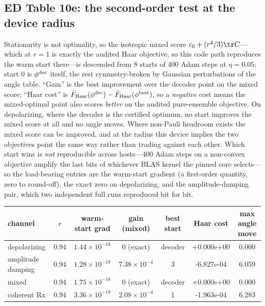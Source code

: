 \documentclass[10pt,a4paper]{article}
\begin{document}
\subsection*{ED Table 10e: the second-order test at the device radius}
Stationarity is not optimality, so the isotropic mixed score $c_0+(r^2/3)\tr C$---which
at $r=1$ is exactly the audited Haar objective, so this code path reproduces the warm
start there---is descended from 8 starts of 400 Adam steps at $\eta=0.05$: start $0$
is $\phi^{\rm dec}$ itself, the rest symmetry-broken by Gaussian perturbations of the
angle table. ``Gain'' is the best improvement over the decoder point on the mixed
score; ``Haar cost'' is $\bar F_{\rm Haar}(\phi^{\rm dec})-\bar F_{\rm Haar}(\phi^{\rm best})$,
so a \emph{negative} cost means the
mixed-optimal point also scores \emph{better} on the audited pure-ensemble
objective. On depolarizing, where
the decoder is the certified optimum, no start improves the mixed score at all and no
angle moves. Where non-Pauli headroom exists the mixed score can be improved, and at
the radius this device implies the two objectives point the same way rather than
trading against each other. Which start wins is \emph{not} reproducible across
hosts---$400$ Adam steps on a non-convex objective amplify the last bits of
whichever BLAS kernel the pinned core selects---so the load-bearing entries are the
warm-start gradient (a first-order quantity, zero to round-off), the exact zero on
depolarizing, and the amplitude-damping pair, which two independent full runs
reproduced bit for bit.
\begin{longtable}{lcccccc}
\toprule channel & $r$ & warm-start grad & gain (mixed) & best start & Haar cost & max angle move \\ \midrule
depolarizing & 0.94 & $1.44\times 10^{-18}$ & $0$ (exact) & decoder & +0.000e+00 & 0.000 \\
amplitude damping & 0.94 & $1.28\times 10^{-18}$ & $7.38\times 10^{-4}$ & 3 & -6.827e-04 & 6.059 \\
mixed & 0.94 & $1.75\times 10^{-18}$ & $0$ (exact) & decoder & +0.000e+00 & 0.000 \\
coherent Rx & 0.94 & $3.36\times 10^{-19}$ & $2.08\times 10^{-4}$ & 1 & -1.963e-04 & 6.283 \\
\bottomrule\end{longtable}
\end{document}
